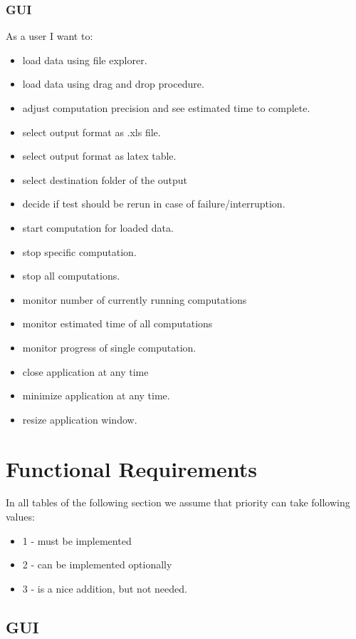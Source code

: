 \documentclass{article}
\begin{document}
\subsubsection{GUI}
As a user I want to:
\begin{itemize}
	\item
		load data using file explorer.
	\item
		load data using drag and drop procedure.
	\item
		adjust computation precision and see estimated time to complete.
	\item
		select output format as .xls file.
	\item
		select output format as latex table.
	\item
		select destination folder of the output
	\item
		decide if test should be rerun in case of failure/interruption.
	\item 
		start computation for loaded data.
	\item
		stop specific computation.
	\item
		stop all computations.
	\item 
		monitor number of currently running computations
	\item
		monitor estimated time of all computations
	\item
		monitor progress of single computation.
	\item
		close application at any time
	\item
		minimize application at any time.
	\item 
		resize application window.
\end{itemize}


	

\newpage

\section{Functional Requirements}
In all tables of the following section we assume that priority can take following values:
\begin{itemize} 
\item 1 - must be implemented
\item 2 - can be implemented optionally 
\item 3 - is a nice addition, but not needed.
\end{itemize} 

\subsection{GUI} \label{GUI_func_req}
\end{document}
